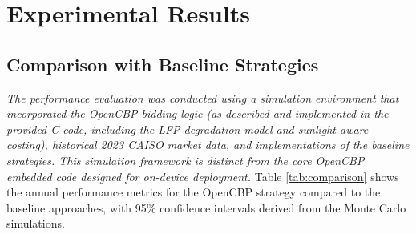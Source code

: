 \documentclass[11pt,a4paper]{article}
\begin{document}
\section{Experimental Results}
\subsection{Comparison with Baseline Strategies}
\textit{The performance evaluation was conducted using a simulation environment that incorporated the OpenCBP bidding logic (as described and implemented in the provided C code, including the LFP degradation model and sunlight-aware costing), historical 2023 CAISO market data, and implementations of the baseline strategies. This simulation framework is distinct from the core OpenCBP embedded code designed for on-device deployment.}
Table \ref{tab:comparison} shows the annual performance metrics for the OpenCBP strategy compared to the baseline approaches, with 95\% confidence intervals derived from the Monte Carlo simulations.
\end{document}
